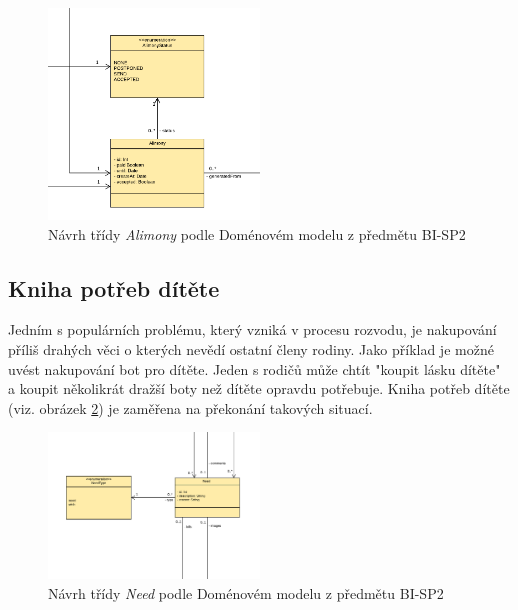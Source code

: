         \begin{figure}\centering
	        \includegraphics[width=0.5\textwidth]{pdfs/Alimony1}
	        \caption[Návrh Alimony]{Návrh třídy \textit{Alimony} podle Doménovém modelu z předmětu BI-SP2}\label{image:Alimony1}
        \end{figure}
    \subsection{Kniha potřeb dítěte}
    
        Jedním s populárních problému, který vzniká v procesu rozvodu, je nakupování příliš drahých věci o kterých nevědí ostatní členy rodiny. Jako příklad je možné uvést nakupování bot pro dítěte. Jeden s rodičů může chtít "koupit lásku dítěte" a koupit několikrát dražší boty než dítěte opravdu potřebuje. Kniha potřeb dítěte (viz. obrázek \ref{image:Need1}) je zaměřena na překonání takových situací.
        \begin{figure}\centering
	        \includegraphics[width=0.5\textwidth]{pdfs/Need1}
	        \caption[Návrh Need]{Návrh třídy \textit{Need} podle Doménovém modelu z předmětu BI-SP2}\label{image:Need1}
        \end{figure}
        
